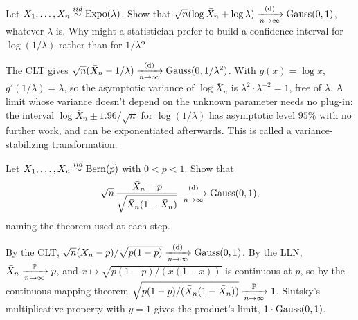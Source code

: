 \begin{exercise}
Let $X_1, \ldots, X_n \stackrel{iid}{\sim} \text{Expo}(\lambda)$. Show that $\sqrt{n}(\log \bar{X}_n + \log \lambda) \xrightarrow [n \to \infty ]{\text{(d)}} \text{Gauss}(0, 1)$, whatever $\lambda$ is. Why might a statistician prefer to build a confidence interval for $\log(1/\lambda)$ rather than for $1/\lambda$?
\end{exercise}
\begin{solution}
The CLT gives $\sqrt{n}(\bar{X}_n - 1/\lambda) \xrightarrow [n \to \infty ]{\text{(d)}} \text{Gauss}(0, 1/\lambda^2)$. With $g(x) = \log x$, $g'(1/\lambda) = \lambda$, so the asymptotic variance of $\log \bar{X}_n$ is $\lambda^2 \cdot \lambda^{-2} = 1$, free of $\lambda$. A limit whose variance doesn't depend on the unknown parameter needs no plug-in: the interval $\log \bar{X}_n \pm 1.96/\sqrt{n}$ for $\log(1/\lambda)$ has asymptotic level $95\%$ with no further work, and can be exponentiated afterwards. This is called a variance-stabilizing transformation.
\end{solution}

\begin{exercise}
Let $X_1, \ldots, X_n \stackrel{iid}{\sim} \text{Bern}(p)$ with $0 < p < 1$. Show that
\[
\sqrt{n}\,\frac{\bar{X}_n - p}{\sqrt{\bar{X}_n(1 - \bar{X}_n)}} \xrightarrow [n \to \infty ]{\text{(d)}} \text{Gauss}(0,1),
\]
naming the theorem used at each step.
\end{exercise}
\begin{solution}
By the CLT, $\sqrt{n}(\bar{X}_n - p)/\sqrt{p(1-p)} \xrightarrow [n \to \infty ]{\text{(d)}} \text{Gauss}(0,1)$. By the LLN, $\bar{X}_n \xrightarrow [n \to \infty ]{\mathbb{P}} p$, and $x \mapsto \sqrt{p(1-p)/(x(1-x))}$ is continuous at $p$, so by the continuous mapping theorem $\sqrt{p(1-p)/(\bar{X}_n(1-\bar{X}_n))} \xrightarrow [n \to \infty ]{\mathbb{P}} 1$. Slutsky's multiplicative property with $y = 1$ gives the product's limit, $1 \cdot \text{Gauss}(0,1)$.
\end{solution}

